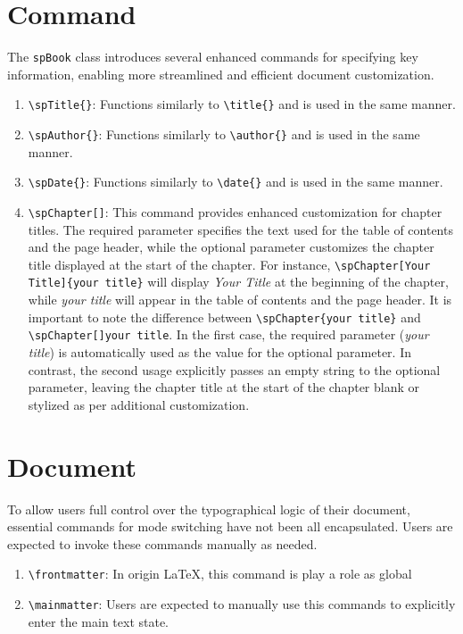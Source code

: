 \section{Command}
    The \texttt{spBook} class introduces several enhanced commands for specifying key information, enabling more streamlined and efficient document customization.
    \begin{enumerate}
        \item \texttt{\textbackslash spTitle\{\}}: Functions similarly to \texttt{\textbackslash title\{\}} and is used in the same manner.
        \item \texttt{\textbackslash spAuthor\{\}}: Functions similarly to \texttt{\textbackslash author\{\}} and is used in the same manner.
        \item \texttt{\textbackslash spDate\{\}}: Functions similarly to \texttt{\textbackslash date\{\}} and is used in the same manner.
        \item \texttt{\textbackslash spChapter[]{}}: This command provides enhanced customization for chapter titles. The required parameter specifies the text used for the table of contents and the page header, while the optional parameter customizes the chapter title displayed at the start of the chapter. For instance, \texttt{\textbackslash spChapter[Your Title]\{your title\}} will display \emph{Your Title} at the beginning of the chapter, while \emph{your title} will appear in the table of contents and the page header. It is important to note the difference between \texttt{\textbackslash spChapter\{your title\}} and \texttt{\textbackslash spChapter[]{your title}}. In the first case, the required parameter (\emph{your title}) is automatically used as the value for the optional parameter. In contrast, the second usage explicitly passes an empty string to the optional parameter, leaving the chapter title at the start of the chapter blank or stylized as per additional customization.
    \end{enumerate}

\section{Document}
    To allow users full control over the typographical logic of their document, essential commands for mode switching have not been all encapsulated. Users are expected to invoke these commands manually as needed.

    \begin{enumerate}
        \item \texttt{\textbackslash frontmatter}: In origin \LaTeX, this command is play a role as global
        \item \texttt{\textbackslash mainmatter}: Users are expected to manually use this commands to explicitly enter the main text state.
    \end{enumerate}